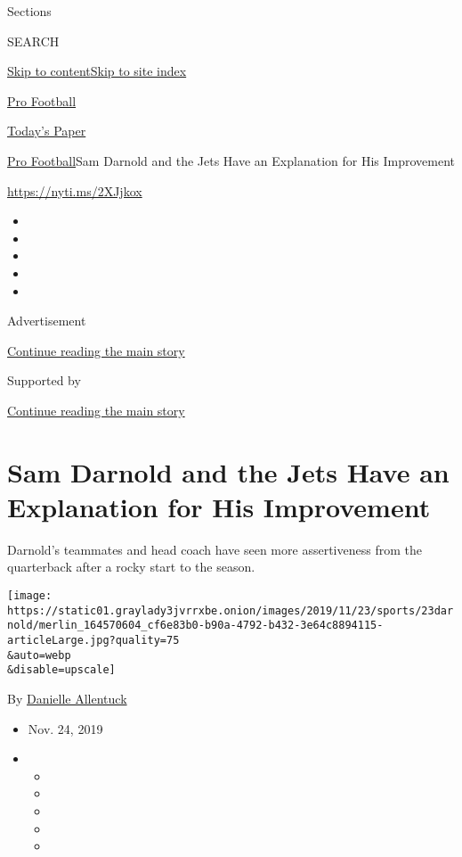 Sections

SEARCH

\protect\hyperlink{site-content}{Skip to
content}\protect\hyperlink{site-index}{Skip to site index}

\href{https://www.nytimes3xbfgragh.onion/section/sports/football}{Pro
Football}

\href{https://myaccount.nytimes3xbfgragh.onion/auth/login?response_type=cookie\&client_id=vi}{}

\href{https://www.nytimes3xbfgragh.onion/section/todayspaper}{Today's
Paper}

\href{/section/sports/football}{Pro Football}\textbar{}Sam Darnold and
the Jets Have an Explanation for His Improvement

\url{https://nyti.ms/2XJjkox}

\begin{itemize}
\item
\item
\item
\item
\item
\end{itemize}

Advertisement

\protect\hyperlink{after-top}{Continue reading the main story}

Supported by

\protect\hyperlink{after-sponsor}{Continue reading the main story}

\hypertarget{sam-darnold-and-the-jets-have-an-explanation-for-his-improvement}{%
\section{Sam Darnold and the Jets Have an Explanation for His
Improvement}\label{sam-darnold-and-the-jets-have-an-explanation-for-his-improvement}}

Darnold's teammates and head coach have seen more assertiveness from the
quarterback after a rocky start to the season.

\texttt{[image: https://static01.graylady3jvrrxbe.onion/images/2019/11/23/sports/23darnold/merlin\_164570604\_cf6e83b0-b90a-4792-b432-3e64c8894115-articleLarge.jpg?quality=75\\\&auto=webp\\\&disable=upscale]}

By
\href{https://www.nytimes3xbfgragh.onion/by/danielle-allentuck}{Danielle
Allentuck}

\begin{itemize}
\item
  Nov. 24, 2019
\item
  \begin{itemize}
  \item
  \item
  \item
  \item
  \item
  \end{itemize}
\end{itemize}

